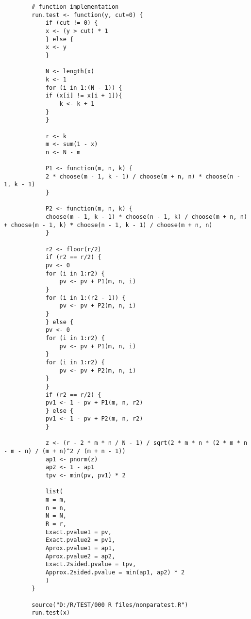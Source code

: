 \documentclass[UTF8]{ctexart}
\numberwithin{equation}{section}
\begin{document}
\begin{center}
    \begin{lstlisting}
        # function implementation             
        run.test <- function(y, cut=0) {
            if (cut != 0) {
            x <- (y > cut) * 1
            } else {
            x <- y
            }
        
            N <- length(x)
            k <- 1
            for (i in 1:(N - 1)) {
            if (x[i] != x[i + 1]){
                k <- k + 1
            }
            }
            
            r <- k
            m <- sum(1 - x)
            n <- N - m
        
            P1 <- function(m, n, k) {
            2 * choose(m - 1, k - 1) / choose(m + n, n) * choose(n - 1, k - 1)
            }
        
            P2 <- function(m, n, k) {
            choose(m - 1, k - 1) * choose(n - 1, k) / choose(m + n, n) + choose(m - 1, k) * choose(n - 1, k - 1) / choose(m + n, n)
            }
            
            r2 <- floor(r/2)
            if (r2 == r/2) {
            pv <- 0
            for (i in 1:r2) {
                pv <- pv + P1(m, n, i)
            }
            for (i in 1:(r2 - 1)) {
                pv <- pv + P2(m, n, i)
            }
            } else {
            pv <- 0
            for (i in 1:r2) {
                pv <- pv + P1(m, n, i)
            }
            for (i in 1:r2) {
                pv <- pv + P2(m, n, i)
            }
            }
            if (r2 == r/2) {
            pv1 <- 1 - pv + P1(m, n, r2)
            } else {
            pv1 <- 1 - pv + P2(m, n, r2)
            }
            
            z <- (r - 2 * m * n / N - 1) / sqrt(2 * m * n * (2 * m * n - m - n) / (m + n)^2 / (m + n - 1))
            ap1 <- pnorm(z)
            ap2 <- 1 - ap1
            tpv <- min(pv, pv1) * 2
            
            list(
            m = m,
            n = n,
            N = N,
            R = r,
            Exact.pvalue1 = pv,
            Exact.pvalue2 = pv1,
            Aprox.pvalue1 = ap1,
            Aprox.pvalue2 = ap2,
            Exact.2sided.pvalue = tpv,
            Approx.2sided.pvalue = min(ap1, ap2) * 2
            )
        }

        source("D:/R/TEST/000 R files/nonparatest.R")
        run.test(x)
    \end{lstlisting}
\end{center}
\end{document}
